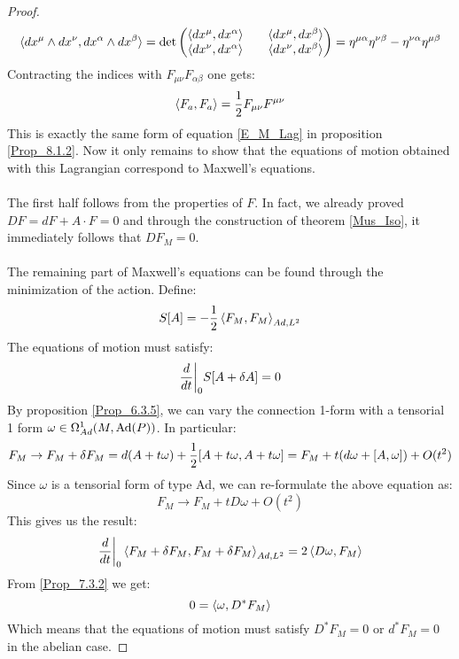 \documentclass[12pt,a4paper]{report}
\theoremstyle{definition}
\theoremstyle{Theorem}
\theoremstyle{definition}
\theoremstyle{definition}
\begin{document}
\begin{proof}
		$$\braket{dx^\mu\wedge dx^\nu,dx^\alpha\wedge dx^\beta}=\det 
		\begin{pmatrix}
			\braket{dx^\mu,dx^\alpha} && \braket{dx^\mu,dx^\beta}\\
			\braket{dx^\nu,dx^\alpha} && \braket{dx^\nu,dx^\beta}\\
		\end{pmatrix}=\eta^{\mu\alpha}\eta^{\nu\beta}-\eta^{\nu\alpha}\eta^{\mu\beta}$$
		Contracting the indices with $F_{\mu\nu}F_{\alpha\beta}$ one gets:
		$$\braket{F_a,F_a}={1\over 2}F_{\mu\nu} F^{\mu\nu}$$
		This is exactly the same form of equation \ref{E_M_Lag} in proposition \ref{Prop_8.1.2}. Now it only remains to show that the equations of motion obtained with this Lagrangian correspond to Maxwell's equations. \\\\
		The first half follows from the properties of $F$. In fact, we already proved $DF=dF+A\cdot F=0$ and through the construction of theorem \ref{Mus_Iso}, it immediately follows that $DF_M=0$.\\
		\\
		The remaining part of Maxwell's equations can be found through the minimization of the action. Define:
		$$S[A]=-{1\over 2}\braket{F_M,F_M}_{Ad,L^2}$$
		The equations of motion must satisfy:
		$${d\over dt}\bigg|_0S[A+\delta A]=0$$
		By proposition \ref{Prop_6.3.5}, we can vary the connection 1-form with a tensorial 1 form $\omega\in\Omega^1_{Ad}(M,\hbox{Ad}(P))$. In particular:
		$$F_M\rightarrow F_M+\delta F_M= d(A+t\omega)+{1\over 2}[A+t\omega,A+t\omega]=F_M+t(d\omega+[A,\omega])+O(t^2)$$
		Since $\omega$ is a tensorial form of type Ad, we can re-formulate the above equation as:
		$$F_M\rightarrow F_M+tD\omega+O(t^2)$$
		This gives us the result:
		$${d\over dt}\bigg|_0\braket{F_M+\delta F_M,F_M+\delta F_M}_{Ad,L^2}=2\braket{D\omega,F_M}$$
		From \ref{Prop_7.3.2} we get:
		$$0=\braket{\omega,D^*F_M}$$
		Which means that the equations of motion must satisfy $D^*F_M=0$ or $d^*F_M=0$ in the abelian case.
	\end{proof}
\end{document}

